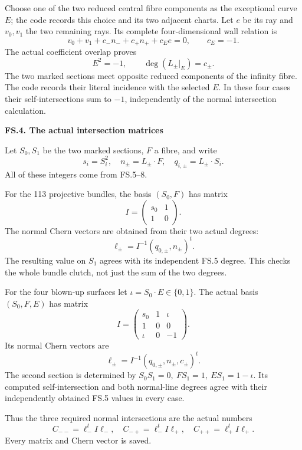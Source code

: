 Choose one of the two reduced central
fibre components as the exceptional
curve \(E\); the code records this
choice and its two adjacent charts.
Let \(e\) be its ray and \(v_0,v_1\)
the two remaining rays. Its complete
four-dimensional wall relation is
\[
 v_0+v_1+c_-n_-+c_+n_++c_E e=0,\qquad c_E=-1.              \tag{FS.10}
\]
The actual coefficient overlap proves
\[
 E^2=-1,\qquad
 \deg(L_\pm|_E)=c_\pm.                                    \tag{FS.11}
\]
The two marked sections meet opposite
reduced components of the infinity fibre.
The code records their literal incidence
with the selected \(E\). In these four
cases their self-intersections sum to
\(-1\), independently of the normal
intersection calculation.

\par

\medskip\noindent\textbf{FS.4. The actual intersection matrices}

\par\nobreak

Let \(S_0,S_1\) be the two marked sections,
\(F\) a fibre, and write
\[
 s_i=S_i^2,\quad
 n_\pm=L_\pm\cdot F,\quad
 q_{i,\pm}=L_\pm\cdot S_i.
\]
All of these integers come from FS.5--8.

For the 113 projective bundles, the
basis \((S_0,F)\) has matrix
\[
 I=\begin{pmatrix}s_0&1\\1&0\end{pmatrix}.                  \tag{FS.12}
\]
The normal Chern vectors are obtained
from their two actual degrees:
\[
 \ell_\pm=I^{-1}(q_{0,\pm},n_\pm)^t.
\]
The resulting value on \(S_1\) agrees
with its independent FS.5 degree.
This checks the whole bundle clutch,
not just the sum of the two degrees.

For the four blown-up surfaces let
\(\iota=S_0\cdot E\in\{0,1\}\). The
actual basis \((S_0,F,E)\) has matrix
\[
 I=\begin{pmatrix}
 s_0&1&\iota\\1&0&0\\\iota&0&-1
 \end{pmatrix}.                                           \tag{FS.13}
\]
Its normal Chern vectors are
\[
 \ell_\pm=I^{-1}
    (q_{0,\pm},n_\pm,c_\pm)^t.                            \tag{FS.14}
\]
The second section is determined by
\(S_0S_1=0,\ FS_1=1,\ ES_1=1-\iota\).
Its computed self-intersection and
both normal-line degrees agree with
their independently obtained FS.5
values in every case.

Thus the three required normal
intersections are the actual numbers
\[
 C_{--}=\ell_-^t I\ell_-,\quad
 C_{-+}=\ell_-^t I\ell_+,\quad
 C_{++}=\ell_+^t I\ell_+.                                 \tag{FS.15}
\]
Every matrix and Chern vector is saved.


